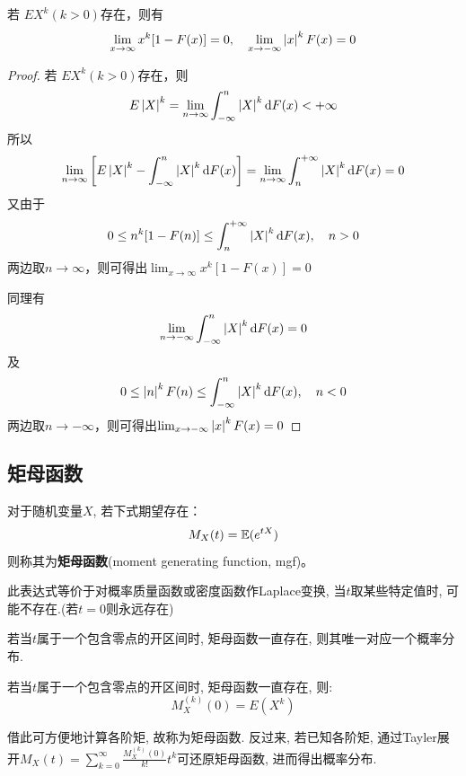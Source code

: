 \begin{proposition}[矩存在的必要条件]
    若 $EX^k(k>0)$存在，则有
    \[ \lim_{x \to \infty}x^k[1-F(x)]=0, \quad \lim_{x \to -\infty}\left\lvert x\right\rvert^kF(x)=0 \]
\end{proposition}
\begin{proof}
    若 $EX^k(k>0)$存在，则
    \[ E\left\lvert X\right\rvert^k = \lim_{n \to \infty} \int_{-\infty}^{n}\left\lvert X\right\rvert^k \mathrm{d} F(x) < +\infty \]
    所以
    \[ \lim_{n \to \infty}\left[ E\left\lvert X\right\rvert^k - \int_{-\infty}^{n}\left\lvert X\right\rvert^k \mathrm{d} F(x) \right]  = \lim_{n \to \infty} \int_{n}^{+\infty}\left\lvert X\right\rvert^k \mathrm{d} F(x) = 0\]
    又由于
    \[ 0 \le n^k[1-F(n)] \le \int_{n}^{+\infty}\left\lvert X\right\rvert^k \mathrm{d} F(x) ,\quad n>0 \]
    两边取$n \to \infty$，则可得出$\lim_{x \to \infty}x^k[1-F(x)]=0$

    同理有
    \[ \lim_{n \to -\infty} \int_{-\infty}^{n}\left\lvert X\right\rvert^k \mathrm{d} F(x) = 0 \]
    及
    \[ 0 \le \left\lvert n\right\rvert^kF(n) \le \int_{-\infty}^{n}\left\lvert X\right\rvert^k \mathrm{d} F(x) ,\quad n<0 \]
    两边取$n \to -\infty$，则可得出$\lim_{x \to -\infty}\left\lvert x\right\rvert^kF(x)=0$
\end{proof}

\subsection{矩母函数}

\begin{definition}
    对于随机变量$X$, 若下式期望存在：
    \[ M_X(t) = \mathbb{E}(e^{tX}) \]
    则称其为\textbf{矩母函数}(moment generating function, mgf)。
\end{definition}
\begin{remark}
    此表达式等价于对概率质量函数或密度函数作Laplace变换, 当$t$取某些特定值时, 可能不存在.(若$t=0$则永远存在)
\end{remark}

\begin{theorem}
    若当$t$属于一个包含零点的开区间时, 矩母函数一直存在, 则其唯一对应一个概率分布.
\end{theorem}

\begin{theorem}
    若当$t$属于一个包含零点的开区间时, 矩母函数一直存在, 则:
    \[ M_X^{(k)}(0) = E(X^k) \]
\end{theorem}
\begin{remark}
    借此可方便地计算各阶矩, 故称为矩母函数. 反过来, 若已知各阶矩, 通过Tayler展开$M_X(t)=\sum_{k=0}^{\infty}\frac{M_X^{(k)}(0)}{k!}t^k$可还原矩母函数, 进而得出概率分布.
\end{remark}

